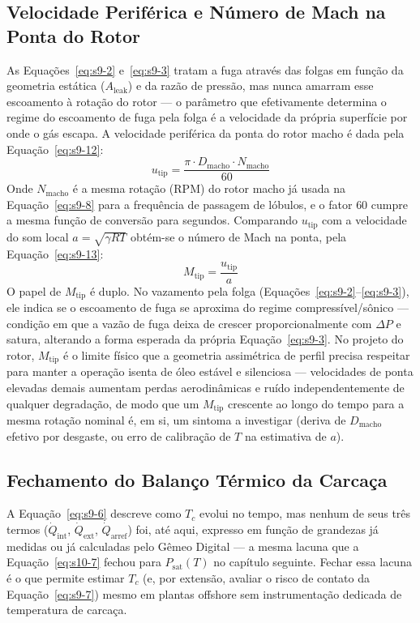 \documentclass[12pt,a4paper]{article}
\numberwithin{equation}{section}
\numberwithin{table}{section}
\numberwithin{figure}{section}
\begin{document}
	\subsection{\textbf{Velocidade Periférica e Número de Mach na Ponta do Rotor}}
	As Equações~\eqref{eq:s9-2} e~\eqref{eq:s9-3} tratam a fuga através das folgas em função da geometria estática ($A_{\text{leak}}$) e da razão de pressão, mas nunca amarram esse escoamento à rotação do rotor — o parâmetro que efetivamente determina o regime do escoamento de fuga pela folga é a velocidade da própria superfície por onde o gás escapa. A velocidade periférica da ponta do rotor macho é dada pela Equação~\eqref{eq:s9-12}:
	\begin{equation}\label{eq:s9-12}
 u_{\text{tip}} = \frac{\pi \cdot D_{\text{macho}} \cdot N_{\text{macho}}}{60}
\end{equation}
	Onde $N_{\text{macho}}$ é a mesma rotação (RPM) do rotor macho já usada na Equação~\eqref{eq:s9-8} para a frequência de passagem de lóbulos, e o fator $60$ cumpre a mesma função de conversão para segundos. Comparando $u_{\text{tip}}$ com a velocidade do som local $a = \sqrt{\gamma R T}$ obtém-se o número de Mach na ponta, pela Equação~\eqref{eq:s9-13}:
	\begin{equation}\label{eq:s9-13}
 M_{\text{tip}} = \frac{u_{\text{tip}}}{a}
\end{equation}
	O papel de $M_{\text{tip}}$ é duplo. No vazamento pela folga (Equações~\eqref{eq:s9-2}--\eqref{eq:s9-3}), ele indica se o escoamento de fuga se aproxima do regime compressível/sônico — condição em que a vazão de fuga deixa de crescer proporcionalmente com $\Delta P$ e satura, alterando a forma esperada da própria Equação~\eqref{eq:s9-3}. No projeto do rotor, $M_{\text{tip}}$ é o limite físico que a geometria assimétrica de perfil precisa respeitar para manter a operação isenta de óleo estável e silenciosa \cite{fleming, hanlon} — velocidades de ponta elevadas demais aumentam perdas aerodinâmicas e ruído independentemente de qualquer degradação, de modo que um $M_{\text{tip}}$ crescente ao longo do tempo para a mesma rotação nominal é, em si, um sintoma a investigar (deriva de $D_{\text{macho}}$ efetivo por desgaste, ou erro de calibração de $T$ na estimativa de $a$).

	\subsection{\textbf{Fechamento do Balanço Térmico da Carcaça}}
	A Equação~\eqref{eq:s9-6} descreve como $T_c$ evolui no tempo, mas nenhum de seus três termos ($\dot{Q}_{\text{int}}$, $\dot{Q}_{\text{ext}}$, $\dot{Q}_{\text{arref}}$) foi, até aqui, expresso em função de grandezas já medidas ou já calculadas pelo Gêmeo Digital — a mesma lacuna que a Equação~\eqref{eq:s10-7} fechou para $P_{\text{sat}}(T)$ no capítulo seguinte. Fechar essa lacuna é o que permite estimar $T_c$ (e, por extensão, avaliar o risco de contato da Equação~\eqref{eq:s9-7}) mesmo em plantas offshore sem instrumentação dedicada de temperatura de carcaça.
\end{document}
